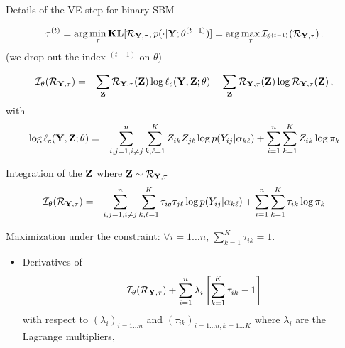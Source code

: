 \documentclass[compress,10pt]{beamer}
\begin{document}
 \begin{frame}[allowframebreaks]{Details of the VE-step for binary SBM}
 
\begin{equation}
 \nonumber
\mathbf{\tau}^{(t)} = \arg \min_{\mathbf{\tau}}  \mathbf{KL}[\mathcal{R}_{\mathbf{Y},\tau}, p(\cdot | \mathbf{Y}; \theta^{(t-1)})] = \arg \max_{\mathbf{\tau}} \mathcal{I}_{\theta^{(t-1)}}(\mathcal{R}_{\mathbf{Y},\mathbf{\tau}}) \,.
 \end{equation}
(we drop out the index $^{(t-1)}$ on $\theta$)

\begin{eqnarray*}
 \mathcal{I}_{\theta}(\mathcal{R}_{\mathbf{Y},\mathbf{\tau}}) &=&   \sum_{\mathbf{Z}} \mathcal{R}_{\mathbf{Y},\mathbf{\tau}}(\mathbf{Z}) \log \ell_c(\mathbf{Y}, \mathbf{Z}; \theta) -  \sum_{\mathbf{Z}} \mathcal{R}_{\mathbf{Y},\mathbf{\tau}}(\mathbf{Z})  \log \mathcal{R}_{\mathbf{Y},\mathbf{\tau}}({\mathbf{Z}})\,,
 \end{eqnarray*}
 with
 \begin{eqnarray*}
 \log \ell_c(\Xall, \bZ; \theta)%
 &=& \sum_{i,j=1, i\neq j}^n \sum_{k,\ell=1}^K Z_{ik}Z_{j\ell}\log p(Y_{ij} |\alpha_{k\ell})+ \sum_{i=1}^n\sum_{k=1}^K Z_{ik} \log\pi_{k}
 \end{eqnarray*}
 
 
Integration of the $\mathbf{Z}$ where $\mathbf{Z} \sim \mathcal{R}_{\mathbf{Y},\mathbf{\tau}}$%
 \begin{eqnarray*}
 \mathcal{I}_{\theta}(\mathcal{R}_{\mathbf{Y},\mathbf{\tau}}) &=& \sum_{i,j=1, i\neq j}^n \sum_{k,\ell=1}^K \tau_{iq}\tau_{j\ell}\log p(Y_{ij} |\alpha_{k\ell})+ \sum_{i=1}^n\sum_{k=1}^K  \tau_{ik} \log\pi_{k} 
 \end{eqnarray*}

 
Maximization under the constraint: $\forall i =1 \dots n$, $\sum_{k=1}^K \tau_{ik}=1$.
 
 
 
\begin{itemize}
 
\item Derivatives of  $$\; \mathcal{I}_{\theta}(\mathcal{R}_{\mathbf{Y},\mathbf{\tau}})  + \sum_{i=1}^n \lambda_i \left[ \sum_{k=1}^K \tau_{ik}-1\right]$$
 with respect to $(\lambda_i)_{i=1\dots n}$ and $(\tau_{ik})_{i=1\dots n, k=1 \dots K}$ where $\lambda_i$ are the Lagrange multipliers, 
 

\end{itemize}
\end{frame}
\end{document}
